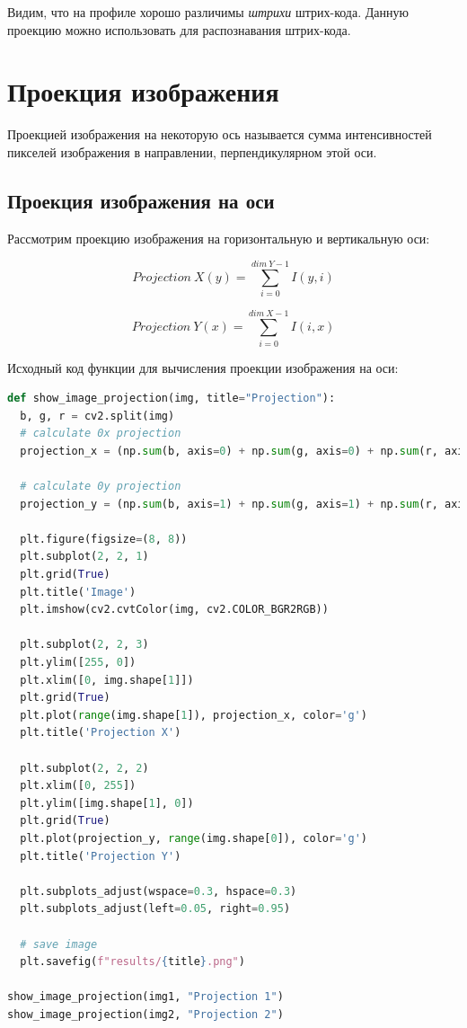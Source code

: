 Видим, что на профиле хорошо различимы  \textit{штрихи} штрих-кода. Данную проекцию можно использовать для распознавания штрих-кода. 

\section{Проекция изображения}

Проекцией изображения на некоторую ось называется сумма интенсивностей пикселей изображения в направлении, перпендикулярном этой оси.

\subsection{Проекция изображения на оси}

Рассмотрим проекцию изображения на горизонтальную и вертикальную оси:

\begin{equation}
  Projection~X(y) = \sum\limits_{i=0}^{dim~Y - 1} I(y, i)
\end{equation}

\begin{equation}
  Projection~Y(x) = \sum\limits_{i=0}^{dim~X - 1} I(i, x)
\end{equation}

Исходный код функции для вычисления проекции изображения на оси:

\begin{lstlisting}[language=Python]
def show_image_projection(img, title="Projection"):
  b, g, r = cv2.split(img)
  # calculate 0x projection
  projection_x = (np.sum(b, axis=0) + np.sum(g, axis=0) + np.sum(r, axis=0)) / img.shape[0] / 3

  # calculate 0y projection
  projection_y = (np.sum(b, axis=1) + np.sum(g, axis=1) + np.sum(r, axis=1)) / img.shape[1] / 3

  plt.figure(figsize=(8, 8))
  plt.subplot(2, 2, 1)
  plt.grid(True)
  plt.title('Image')
  plt.imshow(cv2.cvtColor(img, cv2.COLOR_BGR2RGB))

  plt.subplot(2, 2, 3)
  plt.ylim([255, 0])
  plt.xlim([0, img.shape[1]])
  plt.grid(True)
  plt.plot(range(img.shape[1]), projection_x, color='g')
  plt.title('Projection X')

  plt.subplot(2, 2, 2)
  plt.xlim([0, 255])
  plt.ylim([img.shape[1], 0])
  plt.grid(True)
  plt.plot(projection_y, range(img.shape[0]), color='g')
  plt.title('Projection Y')

  plt.subplots_adjust(wspace=0.3, hspace=0.3)
  plt.subplots_adjust(left=0.05, right=0.95)

  # save image
  plt.savefig(f"results/{title}.png")

show_image_projection(img1, "Projection 1")
show_image_projection(img2, "Projection 2")
\end{lstlisting}

